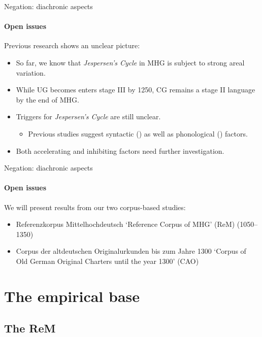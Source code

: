 \documentclass[xcolor=table, compress, %
handout
]{beamer}
\begin{document}
\begin{frame}{Negation: diachronic aspects}
\framesubtitle{Open issues}

Previous research shows an unclear picture:

\begin{itemize}
    \item So far, we know that \textit{Jespersen's Cycle} in MHG is subject to strong areal variation.
    \item While UG becomes enters stage III by 1250, CG remains a stage II language by the end of MHG.
    \item Triggers for \textit{Jespersen's Cycle} are still unclear.
    \begin{itemize}
    \item Previous studies suggest syntactic (\citealt{jaeger08,Breitbarth2014}) as well as phonological (\citealt{HertelimErscheinen}) factors.
    \end{itemize}
    \item Both accelerating and inhibiting factors need further investigation.
    
\end{itemize}


\end{frame}


\begin{frame}{Negation: diachronic aspects}
\framesubtitle{Open issues}

We will present results from our two corpus-based studies:

\begin{itemize}
    \item \alert{Referenzkorpus Mittelhochdeutsch}  ‘Reference Corpus of MHG’ (ReM) (1050–1350)
    \item \alert{Corpus der altdeutschen Originalurkunden bis zum Jahre 1300} ‘Corpus of Old German Original Charters until the year 1300’ (CAO)
\end{itemize}

\end{frame}



\section{The empirical base}
\subsection{The ReM}
\end{document}
